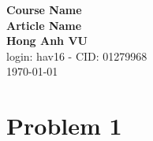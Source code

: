 \documentclass[12pt,oneside,a4paper]{article}
\theoremstyle{break}
\newcommand{\dictentry}[2]{%
  \newglossaryentry{#1}{name=#1,description={#2}}%
  \glslink{#1}{}%
}
\begin{document}
\boldmath
\begin{titlepage}
    \begin{center}
        \vspace*{1cm}
%        
        \Huge
        \textbf{Course Name}\\
%        
        \vspace{0.5cm}
        \LARGE
			\textbf{Article Name}\\
%        
        \vspace{1.5cm}
%        
        \textbf{Hong Anh VU}\\
        login: hav16 - CID: 01279968\\
        \today
%        
        \vfill        
%
%        
%        
    \end{center}
\end{titlepage}
















% 

%

\section*{Problem 1}
\end{document}
